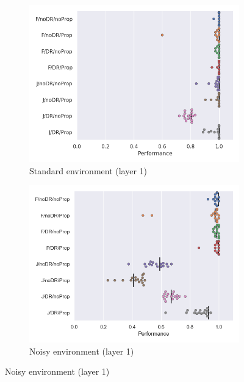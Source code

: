 \begin{figure}
  \centering
  \begin{subfigure}{0.49\linewidth}
    \includegraphics[width=\textwidth]{figures/chapter6/unitablation/conv1_ablations}
    \caption{Standard environment (layer 1)}
  \end{subfigure}
  \begin{subfigure}{0.49\linewidth}
    \includegraphics[width=\textwidth]{figures/chapter6/unitablation/conv1_ablations_noisy}
    \caption{Noisy environment (layer 1)}
  \end{subfigure}


\end{figure}
